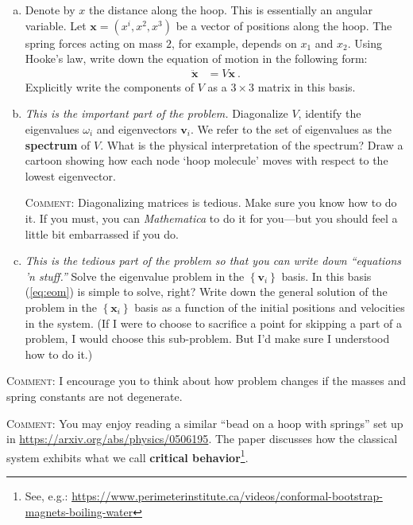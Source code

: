 \documentclass[12pt]{article}
\numberwithin{equation}{subsection}    %
\renewcommand{\vec}[1]{\mathbf{#1}} %
\begin{document}
\begin{enumerate}[(a)]
	\item Denote by $x$ the distance along the hoop. This is essentially an angular variable. Let $\vec{x} = (x^i, x^2, x^3)$ be a vector of positions along the hoop. The spring forces acting on mass $2$, for example, depends on $x_1$ and $x_2$. Using Hooke's law, write down the equation of motion in the following form:
\begin{align}
	\ddot{\vec{x}} &= V \vec{x} \ .
	\label{eq:eom}
\end{align}
Explicitly write the components of $V$ as a $3\times 3$ matrix in this basis.

	\item 
\emph{This is the important part of the problem.}
Diagonalize $V$, identify the eigenvalues $\omega_i$ and eigenvectors $\vec{v}_i$. We refer to the set of eigenvalues as the \textbf{spectrum} of $V$. What is the physical interpretation of the spectrum? Draw a cartoon showing how each node `hoop molecule' moves with respect to the lowest eigenvector. 

\textsc{Comment}: Diagonalizing matrices is tedious. Make sure you know how to do it. If you must, you can \emph{Mathematica} to do it for you---but you should feel a little bit embarrassed if you do. 

\item 
\emph{This is the tedious part of the problem so that you can write down ``equations 'n stuff.''}
Solve the eigenvalue problem in the $\left\{ \vec{v}_i\right \}$ basis. In this basis (\ref{eq:eom}) is simple to solve, right? Write down the general solution of the problem in the $\left\{ \vec{x}_i\right \}$ basis as a function of the initial positions and velocities in the system.  (If I were to choose to sacrifice a point for skipping a part of a problem, I would choose this sub-problem. But I'd make sure I understood how to do it.)

\end{enumerate}

\textsc{Comment}: I encourage you to think about how problem changes if the masses and spring constants are not degenerate. 

\textsc{Comment}: You may enjoy reading a similar ``bead on a hoop with springs'' set up in \url{https://arxiv.org/abs/physics/0506195}. The paper discusses how the classical system exhibits what we call \textbf{critical behavior}\footnote{See, e.g.: \url{https://www.perimeterinstitute.ca/videos/conformal-bootstrap-magnets-boiling-water}}.
\end{document}
